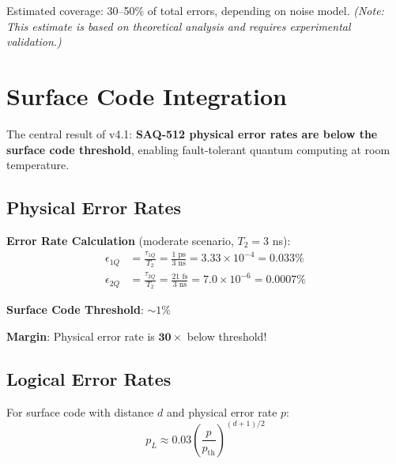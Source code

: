 \documentclass[11pt,a4paper]{article}
\theoremstyle{definition}
\begin{document}
Estimated coverage: 30--50\% of total errors, depending on noise model. \emph{(Note: This estimate is based on theoretical analysis and requires experimental validation.)}

\section{Surface Code Integration}

\begin{newresult}
The central result of v4.1: \textbf{SAQ-512 physical error rates are below the surface code threshold}, enabling fault-tolerant quantum computing at room temperature.
\end{newresult}

\subsection{Physical Error Rates}

\begin{verified}
\textbf{Error Rate Calculation} (moderate scenario, $T_2 = 3$ ns):
\begin{align}
\epsilon_{1Q} &= \frac{\tau_{1Q}}{T_2} = \frac{1 \text{ ps}}{3 \text{ ns}} = 3.33 \times 10^{-4} = 0.033\% \\
\epsilon_{2Q} &= \frac{\tau_{2Q}}{T_2} = \frac{21 \text{ fs}}{3 \text{ ns}} = 7.0 \times 10^{-6} = 0.0007\%
\end{align}

\textbf{Surface Code Threshold}: $\sim 1\%$

\textbf{Margin}: Physical error rate is $\mathbf{30\times}$ below threshold!
\end{verified}

\subsection{Logical Error Rates}

For surface code with distance $d$ and physical error rate $p$:
\begin{equation}
p_L \approx 0.03 \left( \frac{p}{p_{\text{th}}} \right)^{(d+1)/2}
\end{equation}
\end{document}

